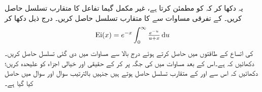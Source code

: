 \quad
یہ دکھا کر کہ  کو  مطمئن کرتا ہے، غیر مکمل گیما تفاعل  کا متقارب تسلسل حاصل کریں۔
\quad
{} کے تفرقی مساوات سے  کا متقارب تسلسل حاصل کریں۔
\quad
درج ذیل دکھا کر
\begin{align*}
\Ei(x)=e^{-x}\int_{0}^{\infty} \tfrac{e^{-u}}{u+x}\dif u
\end{align*}
 کی اتساع   کے طاقتوں میں حاصل کرتے ہوئے  درج بالا سے مساوات  میں دی گئی تسلسل حاصل کریں۔
\quad
دکھائیں کہ  ہے۔اس کے بعد مساوات  میں  کی جگہ  پر کر کے حقیقی اور خیالی اجزاء کو علیحدہ کریں؛دکھائیں کہ اس سے  اور  کے متقارب تسلسل حاصل ہوتے ہیں جنہیں بالترتیب سوال  اور سوال  میں حاصل کیا گیا ہے۔
